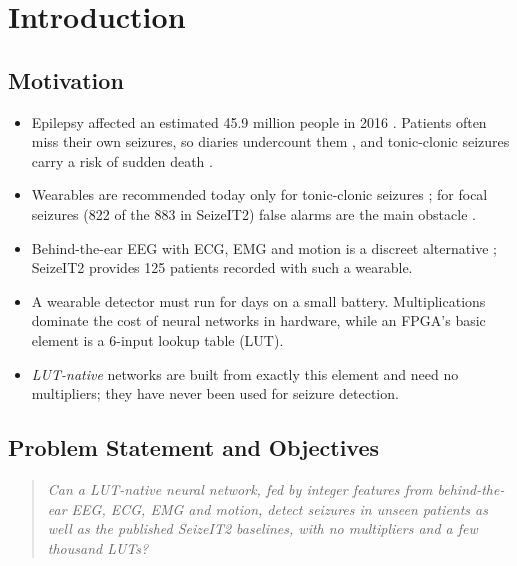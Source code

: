 \chapter{Introduction}

\section{Motivation}

\begin{itemize}
\item Epilepsy affected an estimated 45.9 million people in 2016 \cite{gbd2019epilepsy}. Patients often miss their own
  seizures, so diaries undercount them \cite{elger2018underreporting}, and tonic-clonic seizures carry a risk of sudden
  death \cite{ryvlin2013mortemus}.
\item Wearables are recommended today only for tonic-clonic seizures \cite{beniczky2021guideline}; for focal seizures
  (822 of the 883 in SeizeIT2) false alarms are the main obstacle \cite{swinnen2026seizeit2}.
\item Behind-the-ear EEG with ECG, EMG and motion is a discreet alternative \cite{vandecasteele2020bte,vandecasteele2021ecg};
  SeizeIT2 \cite{bhagubai2025seizeit2} provides 125 patients recorded with such a wearable.
\item A wearable detector must run for days on a small battery. Multiplications dominate the cost of neural networks
  in hardware, while an FPGA's basic element is a 6-input lookup table (LUT).
\item \emph{LUT-native} networks \cite{bacellar2024dwn,petersen2022dlgn,umuroglu2020logicnets} are built from exactly
  this element and need no multipliers; they have never been used for seizure detection.
\end{itemize}

\section{Problem Statement and Objectives}

\begin{quote}
\itshape Can a LUT-native neural network, fed by integer features from behind-the-ear EEG, ECG, EMG and motion, detect
seizures in unseen patients as well as the published SeizeIT2 baselines, with no multipliers and a few thousand LUTs?
\end{quote}

